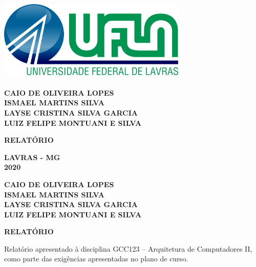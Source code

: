 \documentclass[oneside,a4paper,12pt]{article}
\newcommand{\caio}{CAIO DE OLIVEIRA LOPES}
\newcommand{\ismael}{ISMAEL MARTINS SILVA}
\newcommand{\layse}{LAYSE CRISTINA SILVA GARCIA}
\newcommand{\luiz}{LUIZ FELIPE MONTUANI E SILVA}
\newcommand{\disciplina}{GCC123 – Arquitetura de Computadores II}
\newcommand{\tema}{RELATÓRIO}
\begin{document}
\begin{center}
\includegraphics[width=9cm,height=4cm]{logo-ufla-transparente.png}
\end{center}

\pagestyle{empty}

\vspace{80pt}

\begin{center}
    \textbf{\caio}\\
    \textbf{\ismael}\\
    \textbf{\layse}\\
    \textbf{\luiz}\\
\end{center}

\vspace{110pt}

\begin{center}
    \Large \textbf{\tema}
\end{center}

\vspace{260pt}

\begin{center}
    \textbf{LAVRAS - MG}\\
    \textbf{2020}\\
\end{center}

\begin{center}
    \textbf{\caio}\\
    \textbf{\ismael}\\
    \textbf{\layse}\\
    \textbf{\luiz}\\
\end{center}

\vspace{50pt}

\begin{center}
    \large \textbf{\tema}
\end{center}

\vspace{110pt}

\begin{center}
    \onehalfspacing
    Relatório apresentado à disciplina \disciplina,\\
    como parte das exigências apresentadas no plano de curso.\\  
\end{center}
\end{document}
